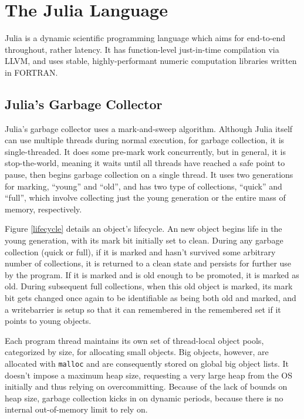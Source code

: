 \section{The Julia Language} \label{julia}
Julia is a dynamic scientific programming language which aims for end-to-end throughout, rather latency.
It has function-level just-in-time compilation via LLVM, and uses stable, highly-performant numeric computation libraries written in FORTRAN.

\subsection{Julia's Garbage Collector}
Julia's garbage collector uses a mark-and-sweep algorithm.
Although Julia itself can use multiple threads during normal execution, for garbage collection, it is single-threaded.
It does some pre-mark work concurrently, but in general, it is stop-the-world, meaning it waits until all threads have reached a safe point to pause, then begins garbage collection on a single thread.
It uses two generations for marking, ``young'' and ``old'', and has two type of collections, ``quick'' and ``full'', which involve collecting just the young generation or the entire mass of memory, respectively.

Figure \ref{lifecycle} details an object's lifecycle.
An new object begins life in the young generation, with its mark bit initially set to clean.
During any garbage collection (quick or full), if it is marked and hasn't survived some arbitrary number of collections, it is returned to a clean state and persists for further use by the program.
If it is marked and is old enough to be promoted, it is marked as old.
During subsequent full collections, when this old object is marked, its mark bit gets changed once again to be identifiable as being both old and marked, and a writebarrier is setup so that it can remembered in the remembered set if it points to young objects.

Each program thread maintains its own set of thread-local object pools, categorized by size, for allocating small objects.
Big objects, however, are allocated with \texttt{malloc} and are consequently stored on global big object lists.
It doesn't impose a maximum heap size, requesting a very large heap from the OS initially and thus relying on overcommitting.
Because of the lack of bounds on heap size, garbage collection kicks in on dynamic periods, because there is no internal out-of-memory limit to rely on.


